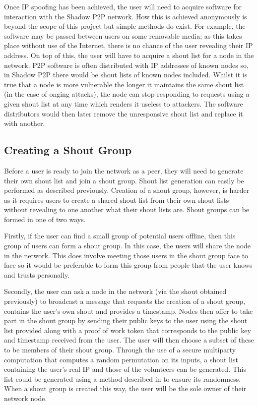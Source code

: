 \documentclass[ %
                    author={Luke Murray},
                supervisor={Dr. Simon Hollis},
                     title={Shadow Peer-to-Peer Networks},
                  subtitle={},
                    degree={MEng},
                      year={2013} ]{thesis}
\begin{document}

Once IP spoofing has been achieved, the user will need to acquire software for interaction with the Shadow P2P network. How this is achieved anonymously is beyond the scope of this project but simple methods do exist. For example, the software may be passed between users on some removable media; as this takes place without use of the Internet, there is no chance of the user revealing their IP address. On top of this, the user will have to acquire a shout list for a node in the network. P2P software is often distributed with IP addresses of known nodes so, in Shadow P2P there would be shout lists of known nodes included. Whilst it is true that a node is more vulnerable the longer it maintains the same shout list (in the case of onging attacks), the node can stop responding to requests using a given shout list at any time which renders it useless to attackers. The software distributors would then later remove the unresponsive shout list and replace it with another. 

\subsection{Creating a Shout Group}

Before a user is ready to join the network as a peer, they will need to generate their own shout list and join a shout group. Shout list generation can easily be performed as described previously. Creation of a shout group, however, is harder as it requires users to create a shared shout list from their own shout lists without revealing to one another what their shout lists are. Shout groups can be formed in one of two ways.

Firstly, if the user can find a small group of potential users offline, then this group of users can form a shout group. In this case, the users will share the node in the network. This does involve meeting those users in the shout group face to face so it would be preferable to form this group from people that the user knows and trusts personally.

Secondly, the user can ask a node in the network (via the shout obtained previously) to broadcast a message that requests the creation of a shout group, contains the user's own shout and provides a timestamp. Nodes then offer to take part in the shout group by sending their public keys to the user using the shout list provided along with a proof of work token that corresponds to the public key and timestamp received from the user. The user will then choose a subset of these to be members of their shout group. Through the use of a secure multiparty computation that computes a random permutation on its inputs, a shout list containing the user's real IP and those of the volunteers can be generated. This list could be generated using a method described in \cite{sweeney2004multiparty} to ensure its randomness. When a shout group is created this way, the user will be the sole owner of their network node.
\end{document}
